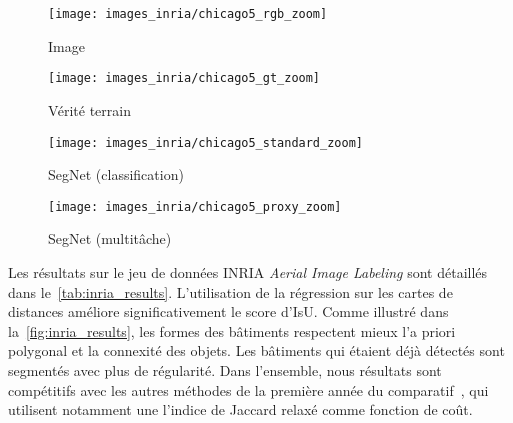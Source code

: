 \begin{figure*}[t]
  \captionsetup{justification=centering,width=0.9\textwidth}
  \begin{subfigure}[t]{0.24\textwidth}
  	\texttt{[image: images\_inria/chicago5\_rgb\_zoom]}
      \caption*{Image }
  \end{subfigure}
  \begin{subfigure}[t]{0.24\textwidth}
  	\texttt{[image: images\_inria/chicago5\_gt\_zoom]}
      \caption*{Vérité terrain}
  \end{subfigure}
  \begin{subfigure}[t]{0.24\textwidth}
  	\texttt{[image: images\_inria/chicago5\_standard\_zoom]}
      \caption*{SegNet (classification)}
  \end{subfigure}
  \begin{subfigure}[t]{0.24\textwidth}
  	\texttt{[image: images\_inria/chicago5\_proxy\_zoom]}
      \caption*{SegNet (multitâche)}
  \end{subfigure}
\captionsetup{justification=justified,width=\textwidth}
\label{fig:inria_results}
\end{figure*}

Les résultats sur le jeu de données INRIA \emph{Aerial Image Labeling} sont détaillés dans le~\cref{tab:inria_results}. L'utilisation de la régression sur les cartes de distances améliore significativement le score d'\gls{IsU}. Comme illustré dans la~\cref{fig:inria_results}, les formes des bâtiments respectent mieux l'a priori polygonal et la connexité des objets. Les bâtiments qui étaient déjà détectés sont segmentés avec plus de régularité. Dans l'ensemble, nous résultats sont compétitifs avec les autres méthodes de la première année du comparatif~\cite{huang_large-scale_2018}, qui utilisent notamment une l'indice de Jaccard relaxé comme fonction de coût.

